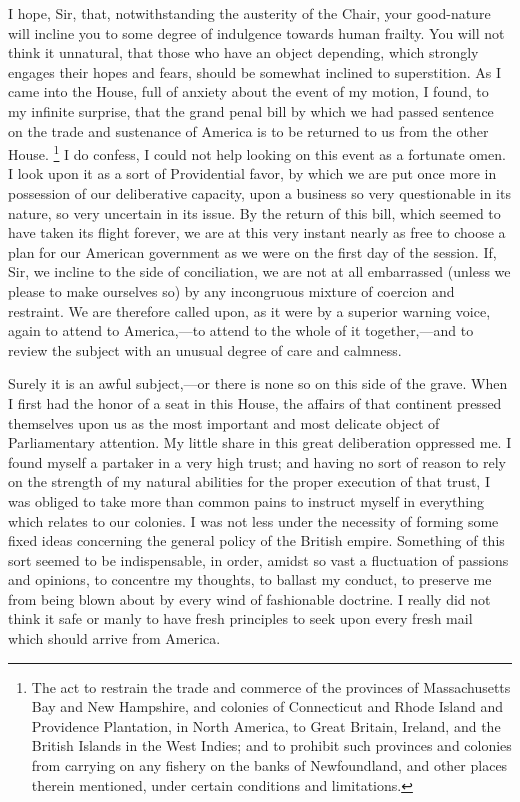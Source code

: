 I hope, Sir, that, notwithstanding the austerity of the Chair, your good-nature will incline you to some degree of indulgence towards human frailty. You will not think it unnatural, that those who have an object depending, which strongly engages their hopes and fears, should be somewhat inclined to superstition. As I came into the House, full of anxiety about the event of my motion, I found, to my infinite surprise, that the grand penal bill by which we had passed sentence on the trade and sustenance of America is to be returned to us from the other House.
\footnote{The act to restrain the trade and commerce of the provinces of Massachusetts Bay and New Hampshire, and colonies of Connecticut and Rhode Island and Providence Plantation, in North America, to Great Britain, Ireland, and the British Islands in the West Indies; and to prohibit such provinces and colonies from carrying on any fishery on the banks of Newfoundland, and other places therein mentioned, under certain conditions and limitations.}
I do confess, I could not help looking on this event as a fortunate omen. I look upon it as a sort of Providential favor, by which we are put once more in possession of our deliberative capacity, upon a business so very questionable in its nature, so very uncertain in its issue. By the return of this bill, which seemed to have taken its flight forever, we are at this very instant nearly as free to choose a plan for our American government as we were on the first day of the session. If, Sir, we incline to the side of conciliation, we are not at all embarrassed (unless we please to make ourselves so) by any incongruous mixture of coercion and restraint. We are therefore called upon, as it were by a superior warning voice, again to attend to America,—to attend to the whole of it together,—and to review the subject with an unusual degree of care and calmness.

Surely it is an awful subject,—or there is none so on this side of the grave. When I first had the honor of a seat in this House, the affairs of that continent pressed themselves upon us as the most important and most delicate object of Parliamentary attention. My little share in this great deliberation oppressed me. I found myself a partaker in a very high trust; and having no sort of reason to rely on the strength of my natural abilities for the proper execution of that trust, I was obliged to take more than common pains to instruct myself in everything which relates to our colonies. I was not less under the necessity of forming some fixed ideas concerning the general policy of the British empire. Something of this sort seemed to be indispensable, in order, amidst so vast a fluctuation of passions and opinions, to concentre my thoughts, to ballast my conduct, to preserve me from being blown about by every wind of fashionable doctrine. I really did not think it safe or manly to have fresh principles to seek upon every fresh mail which should arrive from America.

